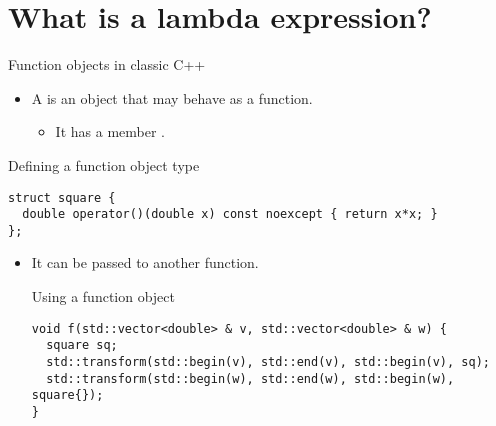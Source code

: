 \section{What is a lambda expression?}

\begin{frame}[t,fragile]{Function objects in classic C++}
\begin{itemize}
  \item A  is an object that may behave as a function.
    \begin{itemize}
      \item It has a member .
    \end{itemize}
\end{itemize}

\begin{block}{Defining a function object type}
\begin{lstlisting}
struct square {
  double operator()(double x) const noexcept { return x*x; }
};
\end{lstlisting}
\end{block}

\begin{itemize}
  \item It can be passed to another function.
\begin{block}{Using a function object}
\begin{lstlisting}
void f(std::vector<double> & v, std::vector<double> & w) {
  square sq;
  std::transform(std::begin(v), std::end(v), std::begin(v), sq);
  std::transform(std::begin(w), std::end(w), std::begin(w), square{});
}
\end{lstlisting}
\end{block}
\end{itemize}
\end{frame}

